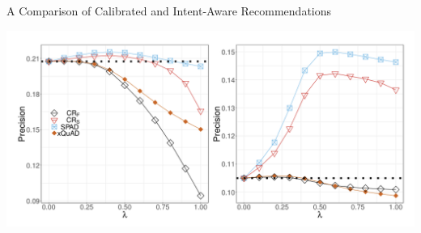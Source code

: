 \documentclass[11pt,aspectratio=169]{beamer}
\begin{document}
\begin{frame}{A Comparison of Calibrated and Intent-Aware Recommendations \cite{BRIDGE}}
\begin{center}
\includegraphics[scale=0.5]{images/spad.png}
\end{center}
\end{frame}
\end{document}
